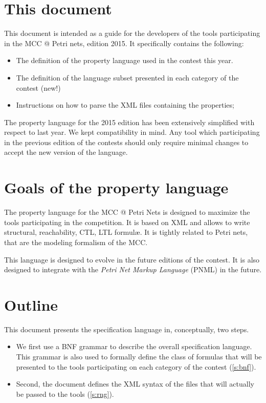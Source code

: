 \documentclass[10pt,english,a4paper]{article}
\newcommand{\mcc}[0]{MCC}
\begin{document}
\color{defaultcolor}

\vspace*{2em}
\section*{This document}

This document is intended as a guide for the developers of
the tools participating in the \mcc{} @ Petri nets, edition 2015.
It specifically contains the following:

\begin{itemize}
\item
  The definition of the property language used in the contest this year.
\item
  The definition of the language subset presented in each category of the
  contest (new!)
\item
  Instructions on how to parse the XML files containing the properties;
\end{itemize}

The property language for the 2015 edition has been
extensively simplified with respect to last year.
We kept compatibility in mind.
Any tool which participating in the previous edition of the contests should
only require minimal changes to accept the new version of the language.


\section*{Goals of the property language}

The property language for the \mcc{} @ Petri Nets is designed to maximize
the tools participating in the competition.
It is based on XML and allows to write structural, reachability, CTL, LTL formul{\ae}.
It is tightly related to Petri nets, that are the modeling formalism of the
\mcc{}.

This language is designed to evolve in the future editions of the contest.
It is also designed to integrate with the \emph{Petri Net Markup Language}
(PNML) in the future.


\section*{Outline}

This document presents the specification language in, conceptually, two steps.
\begin{itemize}
\item
  We first use a BNF grammar to describe the overall specification
  language.  This grammar is also used to formally define the class of
  formulas that will be presented to the tools participating on each
  category of the contest (\cref{s:bnf}).
\item
  Second, the document defines the XML syntax of the files that will
  actually be passed to the tools (\cref{s:rng}).
\end{itemize}
\end{document}
